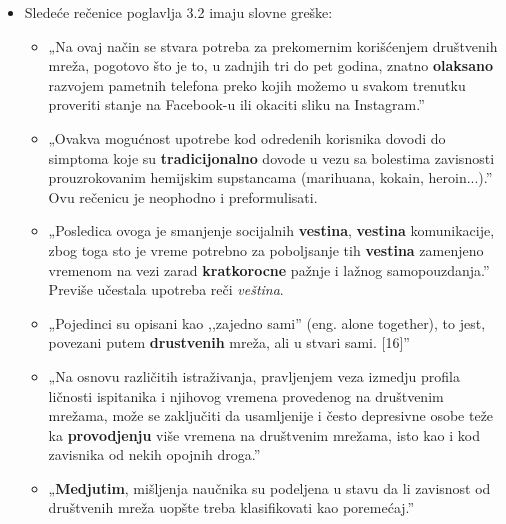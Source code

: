 \documentclass[a4paper]{report}
\begin{document}
\begin{itemize}
    \item Sledeće rečenice poglavlja 3.2 imaju slovne greške: \newline
    \begin{itemize}
        \item  „Na ovaj način se stvara potreba za prekomernim korišćenjem društvenih mreža, pogotovo što je to, u zadnjih tri do pet godina, znatno \textbf{olaksano} razvojem pametnih telefona preko kojih možemo u svakom trenutku proveriti stanje na Facebook-u ili okaciti sliku na Instagram.”
    \end{itemize}
    \begin{itemize}
        \item „Ovakva mogućnost upotrebe kod odredenih korisnika dovodi do simptoma koje su \textbf{tradicijonalno} dovode u vezu sa bolestima zavisnosti prouzrokovanim hemijskim supstancama (marihuana, kokain, heroin...).” \newline
        Ovu rečenicu je neophodno i preformulisati.
    \end{itemize}
    \begin{itemize}
        \item „Posledica ovoga je smanjenje socijalnih \textbf{vestina}, \textbf{vestina} komunikacije, zbog toga sto je vreme potrebno za poboljsanje tih \textbf{vestina} zamenjeno vremenom na vezi zarad \textbf{kratkorocne} pažnje i lažnog samopouzdanja.”\newline
        Previše učestala upotreba reči \textit{veština}.
    \end{itemize}
    \begin{itemize}
        \item  „Pojedinci su opisani kao ,,zajedno sami” (eng. alone together), to jest, povezani putem \textbf{drustvenih} mreža, ali u stvari sami. [16]”
    \end{itemize}
    \begin{itemize}
        \item  „Na osnovu različitih istraživanja, pravljenjem veza izmedju profila ličnosti ispitanika i njihovog vremena provedenog na društvenim mrežama, može se zaključiti da usamljenije i često depresivne osobe teže ka \textbf{provodjenju} više vremena na društvenim mrežama, isto kao i kod zavisnika od nekih opojnih droga.”
    \end{itemize}
    \begin{itemize}
        \item  „\textbf{Medjutim}, mišljenja naučnika su podeljena u stavu da li zavisnost od društvenih mreža uopšte treba klasifikovati kao poremećaj.”
    \end{itemize}
\end{itemize}
\end{document}
